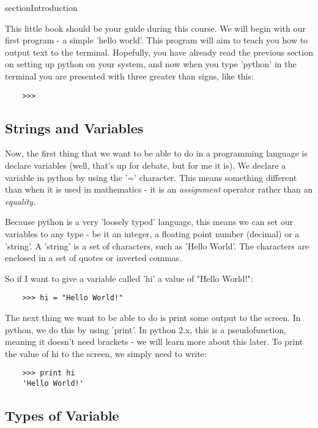 section{Introduction}

This little book should be your guide during this course. We will begin with
our first program - a simple 'hello world'. This program will aim to teach you
how to output text to the terminal. Hopefully, you have already read the
previous section on setting up python on your system, and now when you type
'python' in the terminal you are presented with three greater than signs, like
this:

\begin{lstlisting}
    >>>
\end{lstlisting}

\subsection{Strings and Variables}

Now, the first thing that we want to be able to do in a programming language is
declare variables (well, that's up for debate, but for me it is). We declare a
variable in python by using the '=' character. This means something different
than when it is used in mathematics - it is an \emph{assignment} operator rather
than an \emph{equality}.

Because python is a very 'loosely typed' language, this means we can set our
variables to any type - be it an integer, a floating point number (decimal) or
a 'string'. A 'string' is a set of characters, such as 'Hello World'. The
characters are enclosed in a set of quotes or inverted commas.

So if I want to give a variable called 'hi' a value of "Hello World!":

\begin{lstlisting}
    >>> hi = "Hello World!"
\end{lstlisting}

The next thing we want to be able to do is print some output to the screen. In
python, we do this by using 'print'. In python 2.x, this is a pseudofunction,
meaning it doesn't need brackets - we will learn more about this later. To print
the value of hi to the screen, we simply need to write:

\begin{lstlisting}
    >>> print hi
    'Hello World!'
\end{lstlisting}

\subsection{Types of Variable}


